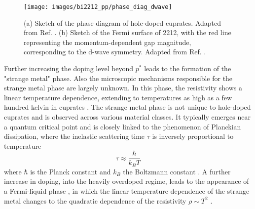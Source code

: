 
\begin{figure}[bh]
	\centering
	\texttt{[image: images/bi2212\_pp/phase\_diag\_dwave]}
	\caption{(a) Sketch of the phase diagram of hole-doped cuprates. Adapted from Ref. \cite{keimer_quantum_2015}. (b) Sketch of the Fermi surface of 2212, with the red line representing the momentum-dependent gap magnitude, corresponding to the d-wave symmetry. Adapted from Ref. \cite{zhang_photoinduced_2017}.}
	\label{fig:phase_diag}
\end{figure}


Further increasing the doping level beyond $p^*$ leads to the formation of the "strange metal" phase.
Also the microscopic mechanisms responsible for the strange metal phase are largely unknown.
In this phase, the resistivity shows a linear temperature dependence, extending to temperatures as high as a few hundred kelvin in cuprates \cite{martin_normal-state_1990, daou_linear_2009, cooper_anomalous_2009}.
The strange metal phase is not unique to hole-doped cuprates and is observed across various material classes.
It typically emerges near a quantum critical point \cite{cooper_anomalous_2009,varma_singular_2002,marel_quantum_2003} and is closely linked to the phenomenon of Planckian dissipation, where the inelastic scattering time $\tau$ is inversely proportional to temperature
\begin{equation}
	\tau \approx \frac{\hbar}{k_BT}
\end{equation}
where $\hbar$ is the Planck constant and $k_B$ the Boltzmann constant \cite{ataei_electrons_2022,bruin_similarity_2013}.
A further increase in doping, into the heavily overdoped regime, leads to the appearance of a Fermi-liquid phase \cite{barisic_evidence_2019}, in which the linear temperature dependence of the strange metal changes to the quadratic dependence of the resistivity $\rho\sim T^2$ \cite{nakamae_electronic_2003,hussey_coherent_2003,plate_fermi_2005}.

